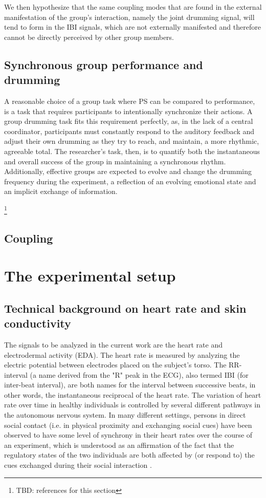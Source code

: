 \documentclass[a4paper, 11pt]{report}      %
\begin{document}
 We then hypothesize that the same coupling modes that are found in the external manifestation of the group's interaction, namely the joint drumming signal, will tend to form in the IBI signals, which are not externally manifested and therefore cannot be directly perceived by other group members. 

\subsection{Synchronous group performance  and drumming}
A reasonable choice of a group task where PS can be compared to performance, is a task that requires participants to intentionally synchronize their actions. A group drumming task fits this requirement perfectly, as, in the lack of a central coordinator, participants must constantly respond to the auditory feedback and adjust their own drumming as they try to reach, and maintain, a more rhythmic, agreeable total. The researcher's task, then, is to quantify both the instantaneous and overall success of the group in maintaining a synchronous rhythm. Additionally, effective groups are expected to evolve and change the drumming frequency during the experiment, a reflection of an evolving emotional state and an implicit exchange of information.

\footnote{TBD: references for this section}

\subsection{Coupling }


\section{The experimental setup}

\subsection{Technical background on heart rate and skin \mbox{conductivity}}
The signals to be analyzed in the current work are the heart rate and electrodermal activity (EDA). 
The heart rate is measured by analyzing the electric potential between electrodes placed on the subject's torso. The RR-interval (a name derived from the "R" peak in the ECG), also termed IBI (for inter-beat interval), are both names for the interval between successive beats, in other words, the instantaneous reciprocal of the heart rate. The variation of heart rate over time in healthy individuals is controlled by several different pathways in the autonomous nervous system. In many different settings, persons in direct social contact (i.e. in physical proximity and exchanging social cues) have been observed to have some level of synchrony in their heart rates over the course of an experiment, which is understood as an affirmation of the fact that the regulatory states of the two individuals are both affected by (or respond to) the cues exchanged during their social interaction \citep{palumbo2017interpersonal}.
\end{document}
